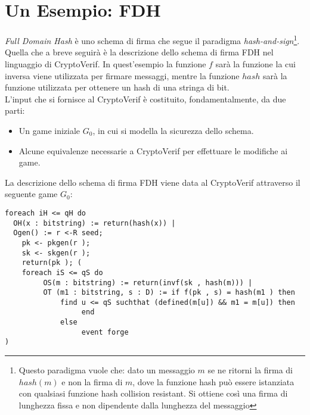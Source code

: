 \documentclass[a4paper,openright,twoside,12pt]{report}
\begin{document}
\newpage

\section{Un Esempio: FDH}
\emph{Full Domain Hash} \`e uno schema di firma che segue il paradigma \emph{hash-and-sign}\footnote{Questo paradigma vuole che: dato un messaggio $m$ se ne ritorni 
la firma di $hash(m)$ e non la firma di $m$, dove la funzione hash pu\`o essere istanziata con qualsiasi funzione hash collision resistant. 
Si ottiene cos\`i una firma di lunghezza fissa e non dipendente dalla lunghezza del messaggio}. 
Quella che a breve seguir\`a \`e la descrizione dello schema di firma FDH nel linguaggio di CryptoVerif. In quest'esempio la funzione $f$ sar\`a la funzione la cui inversa
viene utilizzata per firmare messaggi, mentre la funzione $hash$ sar\`a la funzione utilizzata per ottenere un hash di una stringa di bit.\\
L'input che si fornisce al CryptoVerif \`e costituito, fondamentalmente, da due parti: 
\begin{itemize}
 \item Un game iniziale $G_0$, in cui si modella la sicurezza dello schema.
 \item Alcune equivalenze necessarie a CryptoVerif per effettuare le modifiche ai game. 
\end{itemize}
La descrizione dello schema di firma FDH viene data al CryptoVerif attraverso il seguente game $G_0$:

\begin{verbatim}
foreach iH <= qH do   
  OH(x : bitstring) := return(hash(x)) |
  Ogen() := r <-R seed;     
    pk <- pkgen(r );    
    sk <- skgen(r );       
    return(pk ); (
    foreach iS <= qS do 
         OS(m : bitstring) := return(invf(sk , hash(m))) |
         OT (m1 : bitstring, s : D) := if f(pk , s) = hash(m1 ) then
             find u <= qS suchthat (defined(m[u]) && m1 = m[u]) then
                  end
             else
                  event forge
)         
\end{verbatim}
\end{document}

